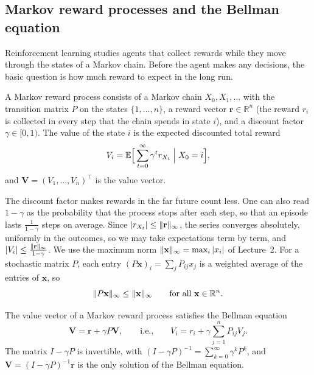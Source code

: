 \subsection{Markov reward processes and the Bellman equation}\label{L4-sec:bellman}

Reinforcement learning studies agents that collect rewards while they move through the states of a Markov chain. Before the agent makes any decisions, the basic question is how much reward to expect in the long run.

\begin{definition}\label{L4-def:mrp}
    A Markov reward process consists of a Markov chain $X_0, X_1, \ldots$ with the transition matrix $P$ on the states $\{1, \ldots, n\}$, a reward vector $\mathbf{r} \in \mathbb{R}^n$ (the reward $r_i$ is collected in every step that the chain spends in state $i$), and a discount factor $\gamma \in [0, 1)$. The value of the state $i$ is the expected discounted total reward
    \[V_i = \mathbb{E}\Big[\sum_{t=0}^\infty \gamma^tr_{X_t} \Bigm| X_0 = i\Big],\]
    and $\mathbf{V} = (V_1, \ldots, V_n)^\top$ is the value vector.
\end{definition}

The discount factor makes rewards in the far future count less. One can also read $1 - \gamma$ as the probability that the process stops after each step, so that an episode lasts $\frac{1}{1 - \gamma}$ steps on average. Since $|r_{X_t}| \leq \lVert \mathbf{r} \rVert_\infty$, the series converges absolutely, uniformly in the outcomes, so we may take expectations term by term, and $|V_i| \leq \frac{\lVert \mathbf{r} \rVert_\infty}{1 - \gamma}$. We use the maximum norm $\lVert \mathbf{x} \rVert_\infty = \max_i |x_i|$ of Lecture~2. For a stochastic matrix $P$, each entry $(P\mathbf{x})_i = \sum_j P_{ij}x_j$ is a weighted average of the entries of $\mathbf{x}$, so
\[\lVert P\mathbf{x} \rVert_\infty \leq \lVert \mathbf{x} \rVert_\infty \qquad \text{for all } \mathbf{x} \in \mathbb{R}^n.\]

\begin{theorem}\label{L4-thm:bellman}
    The value vector of a Markov reward process satisfies the Bellman equation
    \[\mathbf{V} = \mathbf{r} + \gamma P\mathbf{V}, \qquad \text{i.e.,} \qquad V_i = r_i + \gamma\sum_{j=1}^n P_{ij}V_j.\]
    The matrix $I - \gamma P$ is invertible, with $(I - \gamma P)^{-1} = \sum_{k=0}^\infty \gamma^kP^k$, and $\mathbf{V} = (I - \gamma P)^{-1}\mathbf{r}$ is the only solution of the Bellman equation.
\end{theorem}

